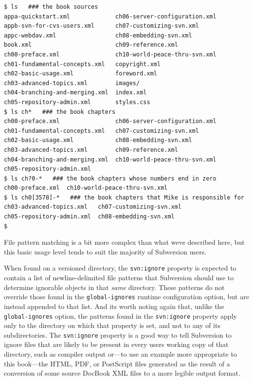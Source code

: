 \begin{verbatim}
$ ls   ### the book sources
appa-quickstart.xml             ch06-server-configuration.xml
appb-svn-for-cvs-users.xml      ch07-customizing-svn.xml
appc-webdav.xml                 ch08-embedding-svn.xml
book.xml                        ch09-reference.xml
ch00-preface.xml                ch10-world-peace-thru-svn.xml
ch01-fundamental-concepts.xml   copyright.xml
ch02-basic-usage.xml            foreword.xml
ch03-advanced-topics.xml        images/
ch04-branching-and-merging.xml  index.xml
ch05-repository-admin.xml       styles.css
$ ls ch*   ### the book chapters
ch00-preface.xml                ch06-server-configuration.xml
ch01-fundamental-concepts.xml   ch07-customizing-svn.xml
ch02-basic-usage.xml            ch08-embedding-svn.xml
ch03-advanced-topics.xml        ch09-reference.xml
ch04-branching-and-merging.xml  ch10-world-peace-thru-svn.xml
ch05-repository-admin.xml
$ ls ch?0-*   ### the book chapters whose numbers end in zero
ch00-preface.xml  ch10-world-peace-thru-svn.xml
$ ls ch0[3578]-*   ### the book chapters that Mike is responsible for
ch03-advanced-topics.xml   ch07-customizing-svn.xml
ch05-repository-admin.xml  ch08-embedding-svn.xml
$
\end{verbatim}

File pattern matching is a bit more complex than what
we\textquotesingle ve described here, but this basic usage level tends
to suit the majority of Subversion users.

When found on a versioned directory, the \texttt{svn:ignore} property is
expected to contain a list of newline-delimited file patterns that
Subversion should use to determine ignorable objects in that \emph{same}
directory. These patterns do not override those found in the
\texttt{global-ignores} runtime configuration option, but are instead
appended to that list. And it\textquotesingle s worth noting again that,
unlike the \texttt{global-ignores} option, the patterns found in the
\texttt{svn:ignore} property apply only to the directory on which that
property is set, and not to any of its subdirectories. The
\texttt{svn:ignore} property is a good way to tell Subversion to ignore
files that are likely to be present in every user\textquotesingle s
working copy of that directory, such as compiler output or---to use an
example more appropriate to this book---the HTML, PDF, or PostScript
files generated as the result of a conversion of some source DocBook XML
files to a more legible output format.

